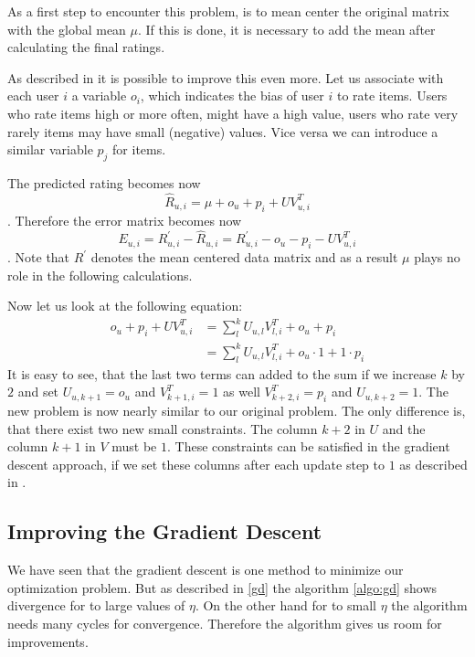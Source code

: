 \documentclass[DIV=14,twocolumn]{scrartcl}
\begin{document}
As a first step to encounter this problem, is to mean center the original matrix with the global mean $\mu$. If this is done, it is necessary to add the mean after calculating the final ratings.

As described in \cite{Ag16} it is possible to improve this even more. Let us associate with each user $i$ a variable $o_i$, which indicates the bias of user $i$ to rate items. Users who rate items high or more often, might have a high value, users who rate very rarely items may have small (negative) values. Vice versa we can introduce a similar variable $p_j$ for items.
 
The predicted rating becomes now $$\hat{R}_{u,i} = \mu + o_u + p_i + UV^T_{u,i}$$. Therefore the error matrix becomes now $$E_{u,i} = R_{u,i}^{'} - \hat{R}_{u,i} = R_{u,i}^{'} - o_u - p_i - UV^T_{u,i}$$. Note that $R^{'}$ denotes the mean centered data matrix and as a result $\mu$ plays no role in the following calculations.

Now let us look at the following equation:
\begin{equation*}
\begin{split}
o_u + p_i + UV^T_{u,i} &= \sum_{l}^{k}U_{u,l}V^T_{l,i} + o_u + p_i\\ &= \sum_{l}^{k}U_{u,l}V^T_{l,i} + o_u\cdot 1 + 1\cdot p_i
\end{split}
\end{equation*}
It is easy to see, that the last two terms can added to the sum if we increase $k$ by $2$ and set $U_{u,k+1}=o_u$ and $V^T_{k+1,i}=1$ as well $V^T_{k+2,i}=p_i$ and $U_{u,k+2}=1$. The new problem is now nearly similar to our original problem. The only difference is, that there exist two new small constraints. The column $k+2$ in $U$ and the column $k+1$ in $V$ must be $1$.
These constraints can be satisfied in the gradient descent approach, if we set these columns after each update step to $1$ as described in \cite{Ag16}.

\subsection{Improving the Gradient Descent}\label{improvinggd}
We have seen that the gradient descent is one method to minimize our optimization problem. But as described in \autoref{gd} the algorithm \autoref{algo:gd} shows divergence for to large values of $\eta$.
On the other hand for to small $\eta$ the algorithm needs many cycles for convergence. Therefore the algorithm gives us room for improvements.
\end{document}
